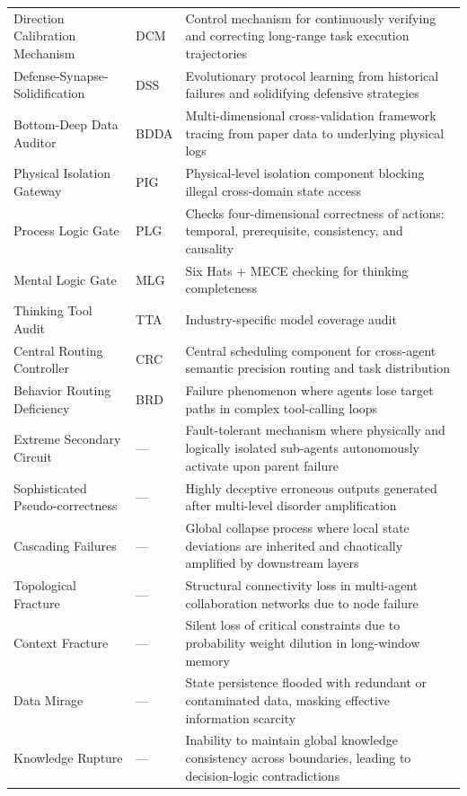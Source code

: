 \documentclass[11pt,a4paper]{article}
\begin{document}
\begin{table}[htbp]
\begin{tabular}{p{}p{}p{}}
Direction Calibration Mechanism & DCM & Control mechanism for continuously verifying and correcting long-range task execution trajectories \\
Defense-Synapse-Solidification & DSS & Evolutionary protocol learning from historical failures and solidifying defensive strategies \\
Bottom-Deep Data Auditor & BDDA & Multi-dimensional cross-validation framework tracing from paper data to underlying physical logs \\
Physical Isolation Gateway & PIG & Physical-level isolation component blocking illegal cross-domain state access \\
Process Logic Gate & PLG & Checks four-dimensional correctness of actions: temporal, prerequisite, consistency, and causality \\
Mental Logic Gate & MLG & Six Hats + MECE checking for thinking completeness \\
Thinking Tool Audit & TTA & Industry-specific model coverage audit \\
Central Routing Controller & CRC & Central scheduling component for cross-agent semantic precision routing and task distribution \\
Behavior Routing Deficiency & BRD & Failure phenomenon where agents lose target paths in complex tool-calling loops \\
Extreme Secondary Circuit & --- & Fault-tolerant mechanism where physically and logically isolated sub-agents autonomously activate upon parent failure \\
Sophisticated Pseudo-correctness & --- & Highly deceptive erroneous outputs generated after multi-level disorder amplification \\
Cascading Failures & --- & Global collapse process where local state deviations are inherited and chaotically amplified by downstream layers \\
Topological Fracture & --- & Structural connectivity loss in multi-agent collaboration networks due to node failure \\
Context Fracture & --- & Silent loss of critical constraints due to probability weight dilution in long-window memory \\
Data Mirage & --- & State persistence flooded with redundant or contaminated data, masking effective information scarcity \\
Knowledge Rupture & --- & Inability to maintain global knowledge consistency across boundaries, leading to decision-logic contradictions \\

\end{tabular}
\end{table}
\end{document}
